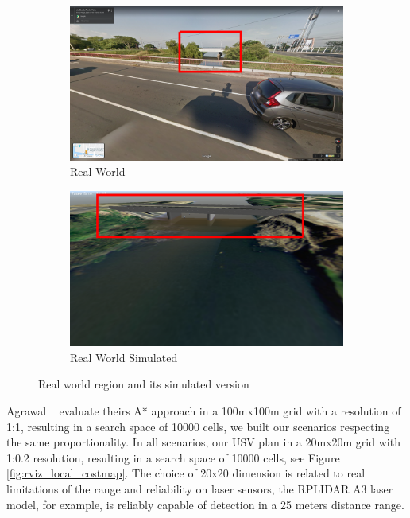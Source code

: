     \begin{figure}[H]
    \centering
        \begin{subfigure}[b]{0.55\textwidth}
            \centering
            \includegraphics[scale=0.1]{figs/Chap5/simulation_diluvio_googleLocation2_1_roundedArea.png}
            \caption{Real World}
            \label{fig:simulation_diluvio_googleLocation2_1_roundedArea}
        \end{subfigure}
        \begin{subfigure}[b]{0.42\textwidth}
            \centering
            \includegraphics[scale=0.1]{figs/Chap5/simulation_diluvio_googleLocation2_2_roundedArea.png}
            \caption{Real World Simulated}
            \label{fig:simulation_diluvio_googleLocation2_2_roundedArea}
        \end{subfigure}
    
    \caption{Real world region and its simulated version}
    \label{fig:simulation_diluvio_googleLocation2_roundedArea}
    \end{figure}
    
    Agrawal \etal ~\cite{Agrawal2015COLREGS} evaluate theirs A* approach in a 100mx100m grid with a resolution of 1:1, resulting in a search space of 10000 cells, we built our scenarios respecting the same proportionality. In all scenarios, our \ac{USV} plan in a 20mx20m grid with 1:0.2 resolution, resulting in a search space of 10000 cells, see Figure \ref{fig:rviz_local_costmap}. The choice of 20x20 dimension is related to real limitations of the range and reliability on laser sensors, the RPLIDAR A3 laser~\cite{RPLidarA3} model, for example, is reliably capable of detection in a 25 meters distance range.
    
